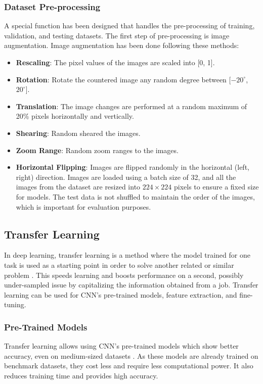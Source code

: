 \documentclass{ijcaArticle}
\begin{document}
\subsubsection{Dataset Pre-processing}
A special function has been designed that handles the pre-processing of training, validation, and testing datasets. The first step of pre-processing is image augmentation. Image augmentation has been done following these methods:
\begin{itemize}
    \item \textbf{Rescaling}: The pixel values of the images are scaled into [0, 1].
    \item \textbf{Rotation}: Rotate the countered image any random degree between [$-20^\circ$, $20^\circ$].
    \item \textbf{Translation}: The image changes are performed at a random maximum of 20\% pixels horizontally and vertically.
    \item \textbf{Shearing}: Random sheared the images.
    \item \textbf{Zoom Range}: Random zoom ranges to the images.
    \item \textbf{Horizontal Flipping}: Images are flipped randomly in the horizontal (left, right) direction. Images are loaded using a batch size of 32, and all the images from the dataset are resized into $224 \times 224$ pixels to ensure a fixed size for models. The test data is not shuffled to maintain the order of the images, which is important for evaluation purposes.
\end{itemize}

\subsection{Transfer Learning}
In deep learning, transfer learning is a method where the model trained for one task is used as a starting point in order to solve another related or similar problem \cite{p25}. This speeds learning and boosts performance on a second, possibly under-sampled issue by capitalizing the information obtained from a job. Transfer learning can be used for CNN's pre-trained models, feature extraction, and fine-tuning.

\subsubsection{Pre-Trained Models}
Transfer learning allows using CNN's pre-trained models which show better accuracy, even on medium-sized datasets \cite{p24}. As these models are already trained on benchmark datasets, they cost less and require less computational power. It also reduces training time and provides high accuracy.
\end{document}
